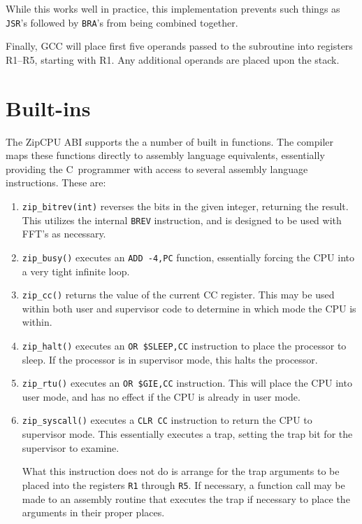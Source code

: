 \documentclass{gqtekspec}
\begin{document}
While this works well in practice, this implementation prevents such things
as {\tt JSR}'s followed by {\tt BRA}'s from being combined together.

Finally, GCC will place first five operands passed to the subroutine into
registers R1--R5, starting with R1.  Any additional operands are placed
upon the stack.
\section{Built-ins}\label{sec:abi-builtin}
The ZipCPU ABI supports the a number of built in functions.  The compiler
maps these functions directly to assembly language equivalents, essentially 
providing the C~programmer with access to several assembly language
instructions.  These are:
\begin{enumerate}
\item {\tt zip\_bitrev(int)} reverses the bits in the given integer, returning
	the result.  This utilizes the internal {\tt BREV} instruction, and is
	designed to be used with FFT's as necessary.
\item {\tt zip\_busy()} executes an {\tt ADD -4,PC} function, essentially
	forcing the CPU into a very tight infinite loop.
\item {\tt zip\_cc()} returns the value of the current CC register.  This may
	be used within both user and supervisor code to determine in which
	mode the CPU is within.
\item {\tt zip\_halt()} executes an \hbox{\tt OR \$SLEEP,CC} instruction to
	place the processor to sleep.  If the processor is in supervisor mode,
	this halts the processor.
\item {\tt zip\_rtu()} executes an \hbox{\tt OR \$GIE,CC} instruction.  This
	will place the CPU into user mode, and has no effect if the CPU is
	already in user mode.
\item {\tt zip\_syscall()} executes a \hbox{\tt CLR CC}
	instruction to return the CPU to supervisor mode.  This essentially
	executes a trap, setting the trap bit for the supervisor to examine.

	What this instruction does not do is arrange for the trap arguments to
	be placed into the  registers {\tt R1} through {\tt R5}.  If necessary,
	a function call may be made to an assembly routine that executes the
	trap if necessary to place the arguments in their proper places.


\end{enumerate}
\end{document}
